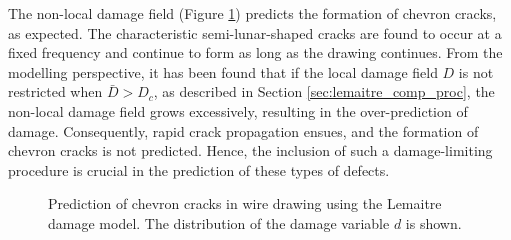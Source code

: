 \documentclass[sn-mathphys,Numbered]{sn-jnl}%
\begin{document}
The non-local damage field (Figure \ref{simulatedChevronCrack}) predicts the formation of chevron cracks, as expected.
The characteristic semi-lunar-shaped cracks are found to occur at a fixed frequency and continue to form as long as the drawing continues.
From the modelling perspective, it has been found that if the local damage field $D$ is not restricted when $\bar{D} > D_c$, as described in Section \ref{sec:lemaitre_comp_proc}, the non-local damage field grows excessively, resulting in the over-prediction of damage.
Consequently, rapid crack propagation ensues, and the formation of chevron cracks is not predicted.
Hence, the inclusion of such a damage-limiting procedure is crucial in the prediction of these types of defects.
\begin{figure}[htbp]
	\centering
		\caption{Prediction of chevron cracks in wire drawing using the Lemaitre damage model. The distribution of the damage variable $d$ is shown.}
	\label{simulatedChevronCrack}
\end{figure}
\end{document}
